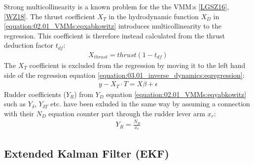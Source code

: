 \documentclass[review]{elsarticle}
\begin{document}
\sphinxAtStartPar
Strong multicollinearity is a known problem for the the VMM:s {[}\hyperlink{cite.bibligraphy:id36}{LGSZ16}{]}, {[}\hyperlink{cite.bibligraphy:id58}{WZ18}{]}.
The thrust coefficient \(X_T\) in the hydrodynamic function \(X_D\) in \autoref{equation:02.01_VMMs:eqxabkowitz} introduces multicollinearity to the regression. This coefficient is therefore instead calculated from the thrust deduction factor \(t_{df}\):
\begin{equation}\label{equation:03.01_inverse_dynamics:eqXthrust}
\begin{split}\displaystyle X_{thrust} = thrust \left(1 - t_{df}\right)\end{split}
\end{equation}
\sphinxAtStartPar
The \(X_T\) coefficient is excluded from the regression by moving it to the left hand side of the regression equation \autoref{equation:03.01_inverse_dynamics:eqregression}:
\begin{equation}\label{equation:03.01_inverse_dynamics:eqexclude}
\begin{split}y-X_T \cdot T = X \beta + \epsilon\end{split}
\end{equation}
\sphinxAtStartPar
Rudder coefficients (\(Y_R\)) from \(Y_D\) equation \autoref{equation:02.01_VMMs:eqyabkowitz} such as \(Y_{\delta}\), \(Y_{\delta T}\) etc. have been exluded in the same way by assuming a connection with their \(N_D\) equation counter part through the rudder lever arm \(x_r\):
\begin{equation}\label{equation:03.01_inverse_dynamics:eqyr}
\begin{split}\displaystyle Y_{R} = \frac{N_{R}}{x_{r}}\end{split}
\end{equation}

\subsection{Extended Kalman Filter (EKF)}
\label{\detokenize{04.01_EK:extended-kalman-filter-ekf}}\label{\detokenize{04.01_EK::doc}}
\end{document}
